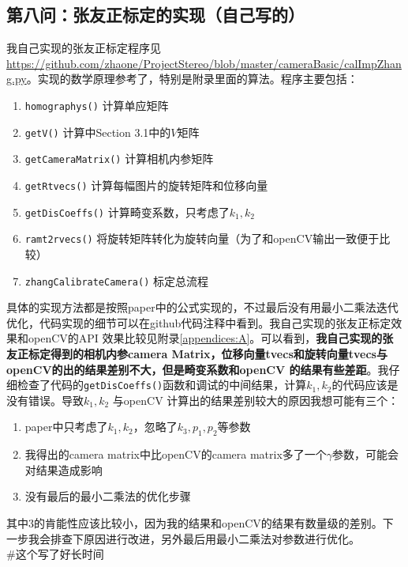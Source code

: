 \documentclass[UTF8]{ctexart}
\begin{document}
\subsection{第八问：张友正标定的实现（自己写的）}
我自己实现的张友正标定程序见\url{https://github.com/zhaone/ProjectStereo/blob/master/cameraBasic/calImpZhang.py}。实现的数学原理参考了\cite{zhang2000flexible}，特别是附录里面的算法。程序主要包括：
\begin{enumerate}
  \item \verb"homographys()" 计算单应矩阵
  \item \verb"getV()" 计算\cite{zhang2000flexible}中Section 3.1中的$V$矩阵
  \item \verb"getCameraMatrix()" 计算相机内参矩阵
  \item \verb"getRtvecs()" 计算每幅图片的旋转矩阵和位移向量
  \item \verb"getDisCoeffs()" 计算畸变系数，只考虑了$k_1,k_2$
  \item \verb"ramt2rvecs()" 将旋转矩阵转化为旋转向量（为了和openCV输出一致便于比较）
  \item \verb"zhangCalibrateCamera()" 标定总流程
\end{enumerate}
具体的实现方法都是按照paper\cite{zhang2000flexible}中的公式实现的，不过最后没有用最小二乘法迭代优化，代码实现的细节可以在github代码注释中看到。我自己实现的张友正标定效果和openCV的API 效果比较见附录\ref{appendices:A}。可以看到，\textbf{我自己实现的张友正标定得到的相机内参camera Matrix，位移向量tvecs和旋转向量tvecs与openCV的出的结果差别不大，但是畸变系数和openCV 的结果有些差距}。我仔细检查了代码的\verb"getDisCoeffs()"函数和调试的中间结果，计算$k_1,k_2$的代码应该是没有错误。导致$k_1,k_2$ 与openCV 计算出的结果差别较大的原因我想可能有三个：
\begin{enumerate}
  \item paper\cite{zhang2000flexible}中只考虑了$k_1,k_2$，忽略了$k_3,p_1,p_2$等参数
  \item 我得出的camera matrix中比openCV的camera matrix多了一个$\gamma$参数，可能会对结果造成影响
  \item 没有最后的最小二乘法的优化步骤
\end{enumerate}
其中3的肯能性应该比较小，因为我的结果和openCV的结果有数量级的差别。下一步我会排查下原因进行改进，另外最后用最小二乘法对参数进行优化。\\
\#这个写了好长时间
\end{document}
